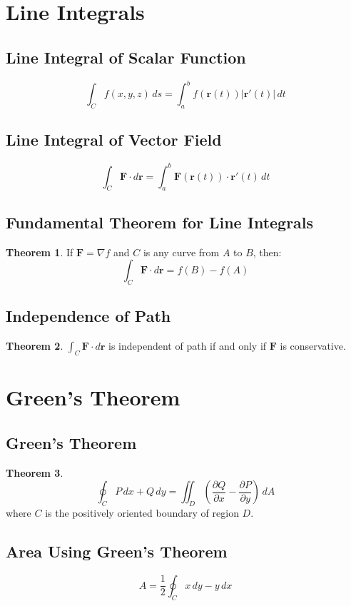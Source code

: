 \documentclass[11pt]{article}
\theoremstyle{definition}
\newtheorem{theorem}{Theorem}[section]
\begin{document}
\section{Line Integrals}

\subsection{Line Integral of Scalar Function}
$$\int_C f(x,y,z) \, ds = \int_a^b f(\mathbf{r}(t)) |\mathbf{r}'(t)| \, dt$$

\subsection{Line Integral of Vector Field}
$$\int_C \mathbf{F} \cdot d\mathbf{r} = \int_a^b \mathbf{F}(\mathbf{r}(t)) \cdot \mathbf{r}'(t) \, dt$$

\subsection{Fundamental Theorem for Line Integrals}
\begin{theorem}
If $\mathbf{F} = \nabla f$ and $C$ is any curve from $A$ to $B$, then:
$$\int_C \mathbf{F} \cdot d\mathbf{r} = f(B) - f(A)$$
\end{theorem}

\subsection{Independence of Path}
\begin{theorem}
$\int_C \mathbf{F} \cdot d\mathbf{r}$ is independent of path if and only if $\mathbf{F}$ is conservative.
\end{theorem}

\section{Green's Theorem}

\subsection{Green's Theorem}
\begin{theorem}
$$\oint_C P \, dx + Q \, dy = \iint_D \left(\frac{\partial Q}{\partial x} - \frac{\partial P}{\partial y}\right) \, dA$$
where $C$ is the positively oriented boundary of region $D$.
\end{theorem}

\subsection{Area Using Green's Theorem}
$$A = \frac{1}{2} \oint_C x \, dy - y \, dx$$
\end{document}
